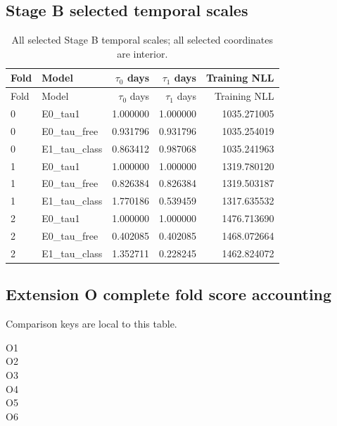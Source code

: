 \subsection{Stage B selected temporal scales}
\label{app:audit09-stage-b-scales}
{\small
\setlength{\tabcolsep}{3pt}
\begin{longtable}{llrrr}
\caption{All selected Stage B temporal scales; all selected coordinates are interior.}\label{tab:b-scales}\\
\toprule
Fold & Model & $\tau_0$ days & $\tau_1$ days & Training NLL\\\midrule
\endfirsthead
\toprule
Fold & Model & $\tau_0$ days & $\tau_1$ days & Training NLL\\\midrule
\endhead
0 & E0\_tau1 & 1.000000 & 1.000000 & 1035.271005\\
0 & E0\_tau\_free & 0.931796 & 0.931796 & 1035.254019\\
0 & E1\_tau\_class & 0.863412 & 0.987068 & 1035.241963\\
1 & E0\_tau1 & 1.000000 & 1.000000 & 1319.780120\\
1 & E0\_tau\_free & 0.826384 & 0.826384 & 1319.503187\\
1 & E1\_tau\_class & 1.770186 & 0.539459 & 1317.635532\\
2 & E0\_tau1 & 1.000000 & 1.000000 & 1476.713690\\
2 & E0\_tau\_free & 0.402085 & 0.402085 & 1468.072664\\
2 & E1\_tau\_class & 1.352711 & 0.228245 & 1462.824072\\
\bottomrule
\end{longtable}
}

\subsection{Extension O complete fold score accounting}
\label{app:audit09-extension-o-folds}
Comparison keys are local to this table. 
\begin{description}
\item[O1] 
\item[O2] 
\item[O3] 
\item[O4] 
\item[O5] 
\item[O6] 
\end{description}

